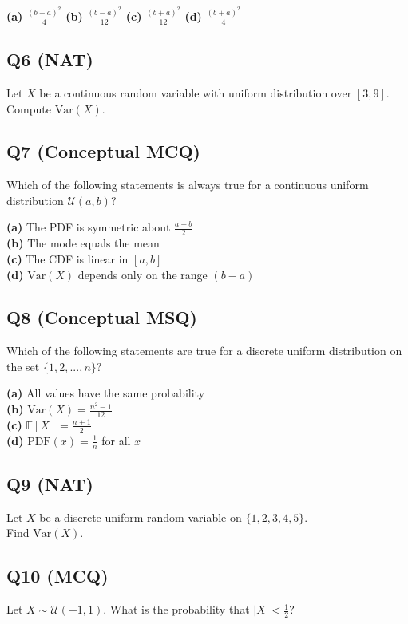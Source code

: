 \textbf{(a)} $\frac{(b-a)^2}{4}$  
\textbf{(b)} $\frac{(b-a)^2}{12}$  
\textbf{(c)} $\frac{(b+a)^2}{12}$  
\textbf{(d)} $\frac{(b+a)^2}{4}$

\subsection*{Q6 (NAT)}
Let $X$ be a continuous random variable with uniform distribution over $[3, 9]$. Compute $\text{Var}(X)$.

\subsection*{Q7 (Conceptual MCQ)}
Which of the following statements is always true for a continuous uniform distribution $\mathcal{U}(a, b)$?

\textbf{(a)} The PDF is symmetric about $\frac{a+b}{2}$  \\
\textbf{(b)} The mode equals the mean  \\
\textbf{(c)} The CDF is linear in $[a, b]$  \\
\textbf{(d)} $\text{Var}(X)$ depends only on the range $(b-a)$

\subsection*{Q8 (Conceptual MSQ)}
Which of the following statements are true for a discrete uniform distribution on the set $\{1, 2, ..., n\}$?

\textbf{(a)} All values have the same probability  \\
\textbf{(b)} $\text{Var}(X) = \frac{n^2 - 1}{12}$  \\
\textbf{(c)} $\mathbb{E}[X] = \frac{n+1}{2}$  \\
\textbf{(d)} $\text{PDF}(x) = \frac{1}{n}$ for all $x$

\subsection*{Q9 (NAT)}
Let $X$ be a discrete uniform random variable on $\{1, 2, 3, 4, 5\}$.\\ 
Find $\text{Var}(X)$.

\subsection*{Q10 (MCQ)}
Let $X \sim \mathcal{U}(-1, 1)$. What is the probability that $|X| < \frac{1}{2}$?

